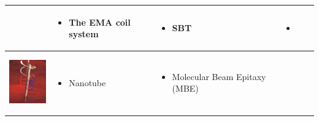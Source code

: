 \documentclass[12pt,a4paper,titlepage]{report}
\begin{document}
\begin{table}[h!]
\begin{tabular}{ c m{2.5cm}  m{4.3cm} m{3cm} m{2cm}}
\begin{minipage}[t]{3cm}
\begin{itemize}
      \end{itemize}
    \end{minipage}
    & 
    \begin{minipage}[t]{3cm}
      \begin{itemize}
        \item The EMA coil system
     
      \end{itemize}
    \end{minipage}
&
  \begin{minipage}[t]{4cm}
      \begin{itemize}
        \item SBT
	
     
      \end{itemize}
    \end{minipage}

&
	 \begin{minipage}[t]{3cm}
	   \begin{itemize}
        \item \citep{kim2013fabrication}
   
      \end{itemize}
   \end{minipage}
    \\ \hline



 \begin{minipage}{.3\textwidth}
      \includegraphics[width=\linewidth, height=25mm]{tube_ta}
    \end{minipage}
    &
    \begin{minipage}[t]{3cm}
      \begin{itemize}
        \item Nanotube
        
      \end{itemize}
    \end{minipage}
    & 
    \begin{minipage}{4cm}
      \begin{itemize}
        \item Molecular Beam Epitaxy (MBE)
	   
	   
    
      \end{itemize}
    \end{minipage}
	&





\end{tabular}
\end{table}
\end{document}
